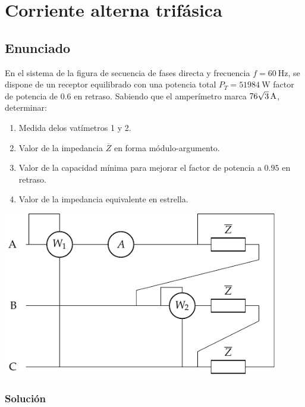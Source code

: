 \chapter{Corriente alterna trifásica}

\section{Enunciado}

\begin{minipage}{0.6\textwidth}
  En el sistema de la figura de secuencia de fases directa y frecuencia
  $f=\qty{60}{\hertz}$, se dispone de un receptor equilibrado con una
  potencia total $P_T=\qty{51984}{\watt}$ factor de potencia de $0.6$ en
  retraso. Sabiendo que el amperímetro marca
  $\qty[parse-numbers=false]{76\sqrt{3}}{\ampere}$, determinar:
  \begin{enumerate}
  \item Medida delos vatímetros 1 y 2.
  \item Valor de la impedancia $\overline{Z}$ en forma módulo-argumento.
  \item Valor de la capacidad mínima para mejorar el factor de potencia
    a $0.95$ en retraso.
  \item Valor de la impedancia equivalente en estrella.
  \end{enumerate}
\end{minipage}
\begin{minipage}{0.4\textwidth}
  \includegraphics[width=0.9\textwidth]{figuras/ej1_CAtrif.pdf}
\end{minipage}

\subsection{Solución}

